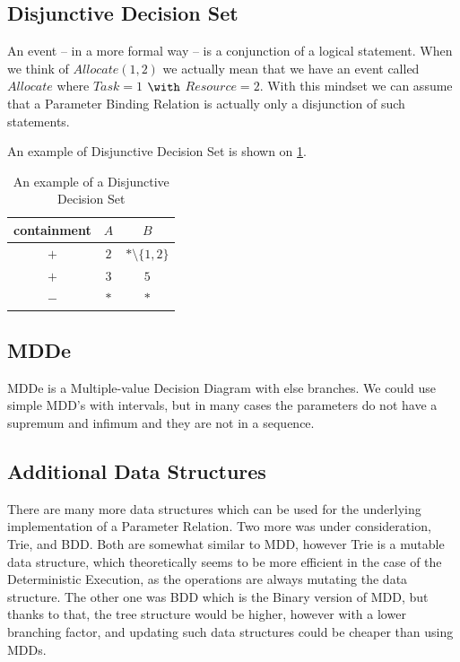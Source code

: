 	\subsection{Disjunctive Decision Set}

	An event -- in a more formal way -- is a conjunction of a logical statement. When we think of $\mathit{Allocate}(1,2)$ we actually mean that we have an event called $\mathit{Allocate}$ where $\mathit{Task} = 1 $ $\with$ $\mathit{Resource} = 2$.
	With this mindset we can assume that a Parameter Binding Relation is actually only a disjunction of such statements.
	
	An example of Disjunctive Decision Set is shown on \cref{tab:cep:dds}.
	
	\begin{table}
		\centering
		\caption{An example of a Disjunctive Decision Set}		
		\label{tab:cep:dds}
		\begin{tabular}{ccc}
			\toprule
			containment &  $A$   &          $B$           \\ \midrule
			    $+$     &  $2$   & $\ast\setminus\{1,2\}$ \\
			    $+$     &  $3$   &          $5$           \\
			    $-$     & $\ast$ &         $\ast$         \\ \bottomrule
		\end{tabular}
	\end{table}

	\subsection{MDDe}
	
	MDDe is a Multiple-value Decision Diagram with else branches. We could use simple MDD's with intervals, but in many cases the parameters do not have a supremum and infimum and they are not in a sequence.
	

	
	\subsection{Additional Data Structures}
	
	There are many more data structures which can be used for the underlying implementation of a Parameter Relation. Two more was under consideration, Trie, and BDD. Both are somewhat similar to MDD, however Trie is a mutable data structure, which theoretically seems to be more efficient in the case of the Deterministic Execution, as the operations are always mutating the data structure. The other one was BDD which is the Binary version of MDD, but thanks to that, the tree structure would be higher, however with a lower branching factor, and updating such data structures could be cheaper than using MDDs.
	
